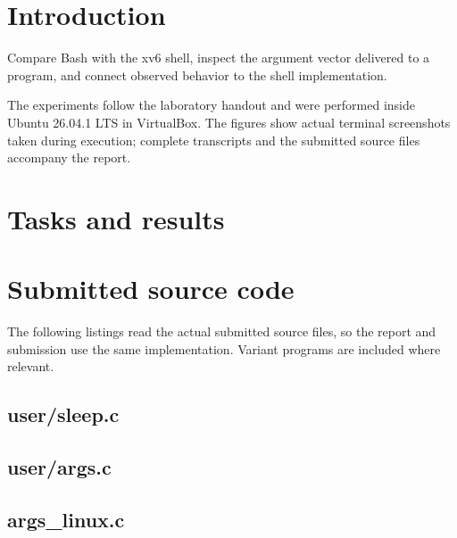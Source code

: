 \documentclass{tum_report}
\begin{document}

\tableofcontents
\thispagestyle{empty}
\clearpage
\chapter{Introduction}
Compare Bash with the xv6 shell, inspect the argument vector delivered to a program, and connect observed behavior to the shell implementation.

The experiments follow the laboratory handout and were performed inside Ubuntu 26.04.1 LTS in VirtualBox. The figures show actual terminal screenshots taken during execution; complete transcripts and the submitted source files accompany the report.
\chapter{Tasks and results}

\par\Needspace{400pt}\vspace{0.4cm}

\par\vspace{0.8cm}

\clearpage
\appendix
\chapter{Submitted source code}
The following listings read the actual submitted source files, so the report and submission use the same implementation. Variant programs are included where relevant.
\Needspace{186pt}
\section{user/sleep.c}

\Needspace{186pt}
\section{user/args.c}

\Needspace{175pt}
\section{args\_linux.c}

\end{document}
